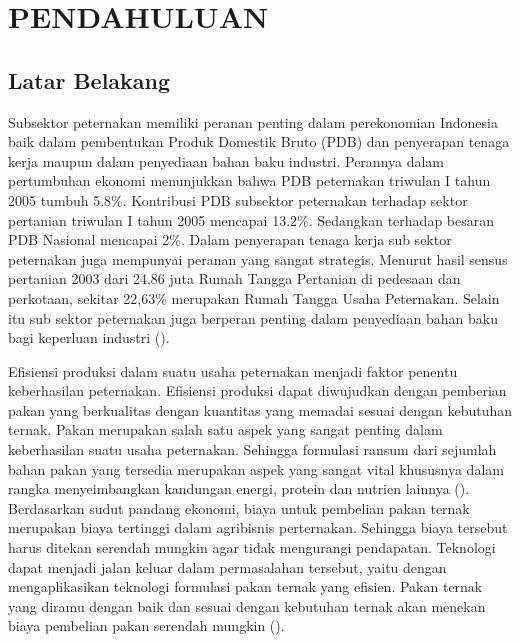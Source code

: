 
\section*{PENDAHULUAN} %

\subsection*{Latar Belakang}
Subsektor peternakan memiliki peranan penting dalam perekonomian Indonesia baik dalam pembentukan Produk Domestik Bruto (PDB) dan penyerapan tenaga kerja maupun dalam penyediaan bahan baku industri. Perannya dalam pertumbuhan ekonomi menunjukkan bahwa PDB peternakan triwulan I tahun 2005 tumbuh 5.8\%. Kontribusi PDB subsektor peternakan terhadap sektor pertanian triwulan I tahun 2005 mencapai 13.2\%. Sedangkan terhadap besaran PDB Nasional mencapai 2\%. Dalam penyerapan tenaga kerja sub sektor peternakan juga mempunyai peranan yang sangat strategis. Menurut hasil sensus pertanian 2003 dari 24,86 juta Rumah Tangga Pertanian di pedesaan dan perkotaan, sekitar 22,63\% merupakan Rumah Tangga Usaha Peternakan. Selain itu sub sektor peternakan juga berperan penting dalam penyediaan bahan baku bagi keperluan industri (\cite{Makka2012}). 

Efisiensi produksi dalam suatu usaha peternakan menjadi faktor penentu keberhasilan peternakan. Efisiensi produksi dapat diwujudkan dengan pemberian pakan yang berkualitas dengan kuantitas yang memadai sesuai dengan kebutuhan ternak. Pakan merupakan salah satu aspek yang sangat penting dalam keberhasilan suatu usaha peternakan. Sehingga formulasi ransum dari sejumlah bahan pakan yang tersedia merupakan aspek yang sangat vital khususnya dalam rangka menyeimbangkan kandungan energi, protein dan nutrien lainnya (\cite{Jayanegara2014}). Berdasarkan sudut pandang ekonomi, biaya untuk pembelian pakan ternak merupakan biaya tertinggi dalam agribisnis perternakan. Sehingga biaya tersebut harus ditekan serendah mungkin agar tidak mengurangi pendapatan. Teknologi dapat menjadi jalan keluar dalam permasalahan tersebut, yaitu dengan mengaplikasikan teknologi formulasi pakan ternak yang efisien. Pakan ternak yang diramu dengan baik dan sesuai dengan kebutuhan ternak akan menekan biaya pembelian pakan serendah mungkin (\cite{Shiddieqy2010}).

